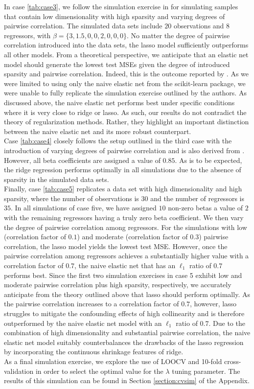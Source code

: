 \noindent In case \ref{tab:case3}, we follow the simulation exercise in \cite{zou2005regularization} for simulating samples that contain low dimensionality with high sparsity and varying degrees of pairwise correlation. The simulated data sets include $20$ observations and 8 regressors, with $\beta=\{3, 1.5, 0, 0, 2, 0, 0, 0\}$. No matter the degree of pairwise correlation introduced into the data sets, the lasso model sufficiently outperforms all other models. From a theoretical perspective, we anticipate that an elastic net model should generate the lowest test MSEs given the degree of introduced sparsity and pairwise correlation. Indeed, this is the outcome reported by \cite{zou2005regularization}. As we were limited to using only the naive elastic net from the scikit-learn package, we were unable to fully replicate the simulation exercise outlined by the authors. As discussed above, the naive elastic net performs best under specific conditions where it is very close to ridge or lasso. As such, our results do not contradict the theory of regularization methods. Rather, they highlight an important distinction between the naive elastic net and its more robust counterpart. \\

\noindent Case \ref{tab:case4} closely follows the setup outlined in the third case with the introduction of varying degrees of pairwise correlation and is also derived from \cite{zou2005regularization}. However, all beta coefficients are assigned a value of $0.85$. As is to be expected, the ridge regression performs optimally in all simulations due to the absence of sparsity in the simulated data sets.      \\

\noindent Finally, case \ref{tab:case5} replicates a data set with high dimensionality and high sparsity, where the number of observations is $30$ and the number of regressors is $35$. In all simulations of case five, we have assigned $10$ non-zero betas a value of $2$ with the remaining regressors having a truly zero beta coefficient. We then vary the degree of pairwise correlation among regressors. For the simulations with low (correlation factor of $0.1$) and moderate (correlation factor of $0.3$) pairwise correlation, the lasso model yields the lowest test MSE. However, once the pairwise correlation among regressors achieves a substantially higher value with a correlation factor of $0.7$, the naive elastic net that has an $\ell_1$ ratio of $0.7$ performs best. Since the first two simulation exercises in case 5 exhibit low and moderate pairwise correlation plus high sparsity, respectively, we accurately anticipate from the theory outlined above that lasso should perform optimally. As the pairwise correlation increases to a correlation factor of $0.7$, however, lasso struggles to mitigate the confounding effects of high collinearity and is therefore outperformed by the naive elastic net model with an $\ell_1$ ratio of $0.7$. Due to the combination of high dimensionality and substantial pairwise correlation, the naive elastic net model suitably counterbalances the drawbacks of the lasso regression by incorporating the continuous shrinkage features of ridge.  \\

\noindent As a final simulation exercise, we explore the use of LOOCV and 10-fold cross-validation in order to select the optimal value for the $\lambda$ tuning parameter. The results of this simulation can be found in Section \ref{section:cvsim} of the Appendix. 




